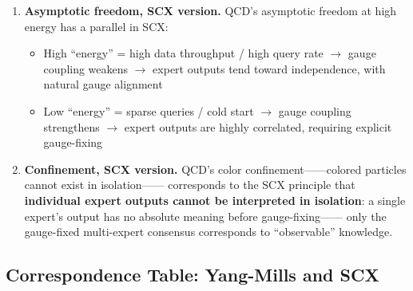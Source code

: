 \documentclass[12pt,a4paper]{article}
\theoremstyle{remark}
\begin{document}
\begin{enumerate}[label=\textbf{(Y\arabic*)}]
    \item \textbf{Asymptotic freedom, SCX version.} QCD's asymptotic freedom at high energy has a parallel in SCX:
    \begin{itemize}
        \item High ``energy'' = high data throughput / high query rate $\to$ gauge coupling weakens $\to$
        expert outputs tend toward independence, with natural gauge alignment
        \item Low ``energy'' = sparse queries / cold start $\to$ gauge coupling strengthens $\to$
        expert outputs are highly correlated, requiring explicit gauge-fixing
    \end{itemize}

    \item \textbf{Confinement, SCX version.} QCD's color confinement——colored particles cannot exist in isolation——
    corresponds to the SCX principle that \textbf{individual expert outputs cannot be interpreted in isolation}: a single expert's output has no absolute meaning before gauge-fixing——
    only the gauge-fixed multi-expert consensus corresponds to ``observable'' knowledge.
\end{enumerate}

\subsection{Correspondence Table: Yang-Mills and SCX}
\end{document}
